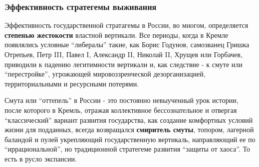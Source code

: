  
 
 
 
 

\subsubsection{Эффективность стратегемы выживания}

Эффективность государственной стратагемы в России, во многом, определяется
\textbf{степенью жестокости} властной вертикали. Все периоды, когда в Кремле появлялись
условные \enquote{либералы} такие, как Борис Годунов, самозванец Гришка Отрепьев, Петр
III, Павел I, Александр II, Николай II, Хрущев или Горбачев, приводили к
падению легитимности вертикали и, как следствие - к смуте или \enquote{перестройке},
угрожающей мировоззренческой дезорганизацией, территориальными и ресурсными
потерями.

Смута или \enquote{оттепель} в России - это постоянно невыученный урок истории, после
которого в Кремль, отражая коллективное бессознательное и отвергая
\enquote{классический} вариант развития государства, как создание комфортных условий
жизни для подданных, всегда возвращался \textbf{смиритель смуты}, топором, лагерной
баландой и пулей укрепляющий государственную вертикаль, направляющий ее по
\enquote{иррациональной}, но традиционной стратегеме развития \enquote{защиты от хаоса}. То
есть в русло экспансии.
